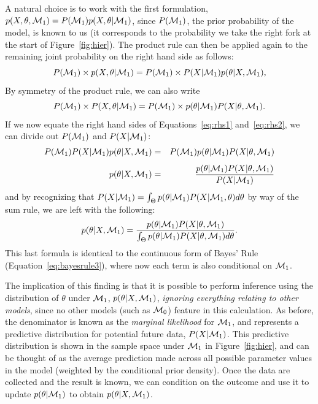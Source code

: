 A natural choice is to work with the first formulation, $p(X,\theta,{\cal M}_1)=P({\cal M}_1)p(X,\theta|{\cal M}_1)$, since $P({\cal M}_1)$, the prior probability of the model, is known to us (it corresponds to the probability we take the right fork at the start of Figure~\ref{fig:hier}). The product rule can then be applied again to the remaining joint probability on the right hand side as follows: 
\begin{equation}\label{eq:rhs1}
  P({\cal M}_1) \times p(X,\theta|{\cal M}_1) = P({\cal M}_1) \times P(X|{\cal M}_1)p(\theta|X,{\cal M}_1),
\end{equation}
By symmetry of the product rule, we can also write 
\begin{equation}\label{eq:rhs2}
  P({\cal M}_1) \times P(X,\theta|{\cal M}_1) = P({\cal M}_1) \times p(\theta|{\cal M}_1)P(X|\theta,{\cal M}_1).
\end{equation}
If we now equate the right hand sides of Equations~\ref{eq:rhs1} and~\ref{eq:rhs2}, we can divide out $P({\cal M}_1)$ and $P(X|{\cal M}_1)$:
\begin{eqnarray*}
  P({\cal M}_1)P(X|{\cal M}_1)p(\theta|X,{\cal M}_1) &=& P({\cal M}_1)p(\theta|{\cal M}_1)P(X|\theta,{\cal M}_1)\\[1ex]
  p(\theta|X,{\cal M}_1) &=& \frac{p(\theta|{\cal M}_1)P(X|\theta,{\cal M}_1)}{P(X|{\cal M}_1)}
\end{eqnarray*}
and by recognizing that ${P(X|{\cal M}_1)=\int_\Theta p(\theta|{\cal M}_1)P(X|{\cal M}_1,\theta)d\theta}$ by way of the sum rule, we are left with the following:
\begin{equation}\label{eq:MCpost}
  p(\theta|X,{\cal M}_1) = \dfrac{p(\theta|{\cal M}_1)P(X|\theta,{\cal M}_1)}{\int_\Theta p(\theta|{\cal M}_1)P(X|\theta,{\cal M}_1)d\theta}.
\end{equation}
This last formula is identical to the continuous form of Bayes' Rule (Equation~\ref{eq:bayesrule3}), where now each term is also conditional on ${\cal M}_1$.

The implication of this finding is that it is possible to perform inference using the distribution of $\theta$ under ${\cal M}_1$, $p(\theta|X,{\cal M}_1)$, \emph{ignoring everything relating to other models}, since no other models (such as ${\cal M}_0$) feature in this calculation. As before, the denominator is known as the \textit{marginal likelihood} for ${\cal M}_1$, and represents a predictive distribution for potential future data, $P(X|{\cal M}_1)$. This predictive distribution is shown in the sample space under ${\cal M}_1$ in Figure~\ref{fig:hier}, and can be thought of as the average prediction made across all possible parameter values in the model (weighted by the conditional prior density). Once the data are collected and the result is known, we can condition on the outcome and use it to update $p(\theta|{\cal M}_1)$ to obtain $p(\theta|X,{\cal M}_1)$. 

